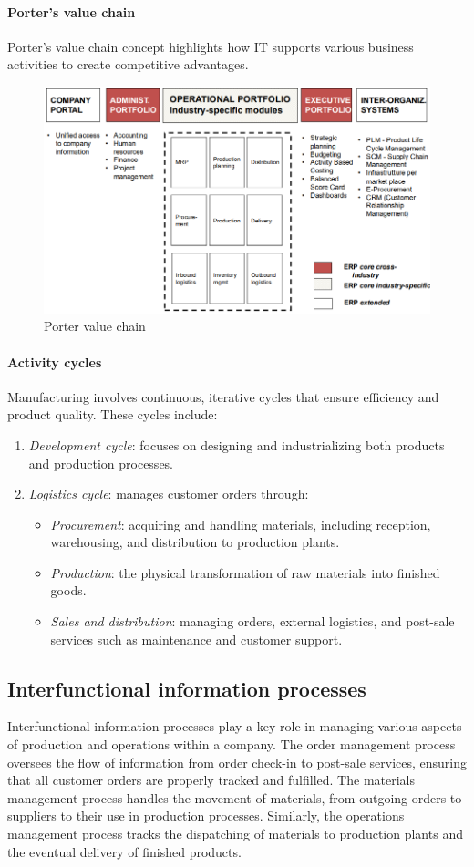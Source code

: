 \paragraph*{Porter's value chain}
Porter’s value chain concept highlights how IT supports various business activities to create competitive advantages.
\begin{figure}[H]
    \centering
    \includegraphics[width=0.5\linewidth]{images/bis1.png}
    \caption{Porter value chain}
\end{figure}

\paragraph*{Activity cycles}
Manufacturing involves continuous, iterative cycles that ensure efficiency and product quality. 
These cycles include:
\begin{enumerate}
    \item \textit{Development cycle}: focuses on designing and industrializing both products and production processes.
    \item \textit{Logistics cycle}: manages customer orders through:
        \begin{itemize}
            \item \textit{Procurement}: acquiring and handling materials, including reception, warehousing, and distribution to production plants.
            \item \textit{Production}: the physical transformation of raw materials into finished goods.
            \item \textit{Sales and distribution}: managing orders, external logistics, and post-sale services such as maintenance and customer support.
        \end{itemize}
\end{enumerate}

\subsection{Interfunctional information processes}
Interfunctional information processes play a key role in managing various aspects of production and operations within a company. 
The order management process oversees the flow of information from order check-in to post-sale services, ensuring that all customer orders are properly tracked and fulfilled. 
The materials management process handles the movement of materials, from outgoing orders to suppliers to their use in production processes. 
Similarly, the operations management process tracks the dispatching of materials to production plants and the eventual delivery of finished products.

